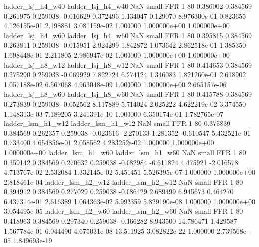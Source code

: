        ladder_lsj_h4_w40        ladder_lsj_h4_w40                   NaN      small      FFR                 1 80 0.386002       0.384569 0.261975       0.259038   -0.016629      0.372496      1.134047     0.129070   8.976300e-01  0.823655 4.126155e-01     2.198881   3.081159e-02            1.000000    1.000000e+00        1.000000e+00
       ladder_lsj_h4_w60        ladder_lsj_h4_w60                   NaN      small      FFR                 1 80 0.395815       0.384569 0.263811       0.259038   -0.015951      2.924299      1.842872     1.073642   2.862518e-01  1.385350 1.698448e-01     2.211805   2.986947e-02            1.000000    1.000000e+00        1.000000e+00
       ladder_lsj_h8_w12        ladder_lsj_h8_w12                   NaN      small      FFR                 1 80 0.414653       0.384569 0.275290       0.259038   -0.069929      7.822724      6.274124     1.346083   1.821260e-01  2.618902 1.057188e-02     6.567068   4.963048e-09            1.000000    1.000000e+00        2.665157e-06
       ladder_lsj_h8_w60        ladder_lsj_h8_w60                   NaN      small      FFR                 1 80 0.415788       0.384569 0.273839       0.259038   -0.052562      8.117889      5.714024     2.025222   4.622219e-02  3.374550 1.148313e-03     7.189205   3.241391e-10            1.000000    6.350174e-01        1.782765e-07
       ladder_lsm_h1_w12        ladder_lsm_h1_w12                   NaN      small      FFR                 1 80 0.375839       0.384569 0.262357       0.259038   -0.023616     -2.270133      1.281352    -0.610547   5.432521e-01  0.733400 4.654856e-01     2.058562   4.283252e-02            1.000000    1.000000e+00        1.000000e+00
       ladder_lsm_h1_w60        ladder_lsm_h1_w60                   NaN      small      FFR                 1 80 0.359142       0.384569 0.270632       0.259038   -0.082984     -6.611824      4.475921    -2.016578   4.713767e-02  2.532084 1.332145e-02     5.451451   5.526395e-07            1.000000    1.000000e+00        2.818461e-04
       ladder_lsm_h2_w12        ladder_lsm_h2_w12                   NaN      small      FFR                 1 80 0.394912       0.384569 0.277029       0.259038   -0.086429      2.689499      6.945673     0.464270   6.437314e-01  2.616389 1.064363e-02     5.992359   5.829190e-08            1.000000    1.000000e+00        3.054495e-05
       ladder_lsm_h2_w60        ladder_lsm_h2_w60                   NaN      small      FFR                 1 80 0.418963       0.384569 0.297340       0.259038   -0.166282      8.943500     14.786471     1.429587   1.567784e-01  6.044490 4.675031e-08    13.511925   3.082822e-22            1.000000    2.739568e-05        1.849693e-19
